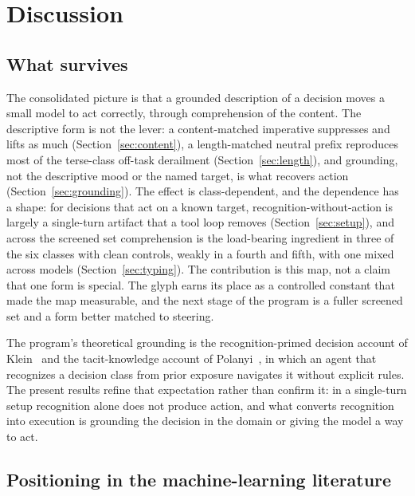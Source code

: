\documentclass[11pt,a4paper]{article}
\begin{document}
\section{Discussion}

\subsection{What survives}\label{sec:survives}

The consolidated picture is that a grounded description of a decision moves a small
model to act correctly, through comprehension of the content. The descriptive form is
not the lever: a content-matched imperative suppresses and lifts as much
(Section~\ref{sec:content}), a length-matched neutral prefix reproduces most of the
terse-class off-task derailment (Section~\ref{sec:length}), and grounding, not the
descriptive mood or the named target, is what recovers action
(Section~\ref{sec:grounding}). The effect is class-dependent, and the dependence has a
shape: for decisions that act on a known target, recognition-without-action is largely a
single-turn artifact that a tool loop removes (Section~\ref{sec:setup}), and across the
screened set comprehension is the load-bearing ingredient in three of the six classes with
clean controls, weakly in a fourth and fifth, with one mixed across models (Section~\ref{sec:typing}). The contribution is
this map, not a claim that one form is special. The glyph earns its place as a
controlled constant that made the map measurable, and the next stage of the program is a
fuller screened set and a form better matched to steering.

The program's theoretical grounding is the recognition-primed decision account of
Klein~\citep{klein1998} and the tacit-knowledge account of Polanyi~\citep{polanyi1966},
in which an agent that recognizes a decision class from prior exposure navigates it
without explicit rules. The present results refine that expectation rather than confirm
it: in a single-turn setup recognition alone does not produce action, and what converts
recognition into execution is grounding the decision in the domain or giving the model a
way to act.

\subsection{Positioning in the machine-learning literature}\label{sec:positioning}
\end{document}
